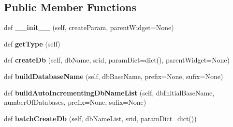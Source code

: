 \subsection*{Public Member Functions}
\begin{DoxyCompactItemize}
\item 
\mbox{\label{class_dsg_tools_1_1_factories_1_1_db_creator_factory_1_1db_creator_1_1_db_creator_a3e46db23ae51b3ed6daedd770b89f7cb}} 
def {\bfseries \+\_\+\+\_\+init\+\_\+\+\_\+} (self, create\+Param, parent\+Widget=None)
\item 
\mbox{\label{class_dsg_tools_1_1_factories_1_1_db_creator_factory_1_1db_creator_1_1_db_creator_a839ec8ae9f419eef0622296c97633359}} 
def {\bfseries get\+Type} (self)
\item 
\mbox{\label{class_dsg_tools_1_1_factories_1_1_db_creator_factory_1_1db_creator_1_1_db_creator_a472abd60f7ec371ccd2f02f09b433a95}} 
def {\bfseries create\+Db} (self, db\+Name, srid, param\+Dict=dict(), parent\+Widget=None)
\item 
\mbox{\label{class_dsg_tools_1_1_factories_1_1_db_creator_factory_1_1db_creator_1_1_db_creator_aca4968736f69694e956a17292325c806}} 
def {\bfseries build\+Database\+Name} (self, db\+Base\+Name, prefix=None, sufix=None)
\item 
\mbox{\label{class_dsg_tools_1_1_factories_1_1_db_creator_factory_1_1db_creator_1_1_db_creator_ad1cf7bdabbbc2bd4e9702520767f4667}} 
def {\bfseries build\+Auto\+Incrementing\+Db\+Name\+List} (self, db\+Initial\+Base\+Name, number\+Of\+Databases, prefix=None, sufix=None)
\item 
\mbox{\label{class_dsg_tools_1_1_factories_1_1_db_creator_factory_1_1db_creator_1_1_db_creator_a01b81c771a2c473ab6153b1939420c78}} 
def {\bfseries batch\+Create\+Db} (self, db\+Name\+List, srid, param\+Dict=dict())

\end{DoxyCompactItemize}
